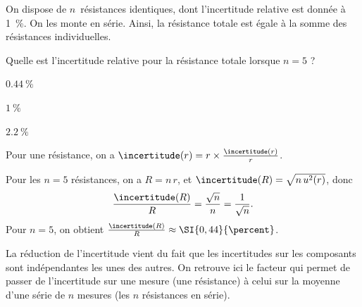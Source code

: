 \hauteurLargeurCadreReponse		{6mm}{1.5cm}
\initialisationEntrainement

On dispose de $n$~résistances identiques, dont l'incertitude relative est donnée à \SI{1}{\percent}. On les monte en série. Ainsi, la résistance totale est égale à la somme des résistances individuelles.

\debutEntrainement


\begin{enonce}
  Quelle est  l'incertitude relative pour la résistance totale lorsque $n=5$ ?
	
	\begin{listeQCM3Colonnes}
    \item $\SI{0,44}{\percent}$
	\item $\SI{1}{\percent}$
	\item $\SI{2,2}{\percent}$
	\end{listeQCM3Colonnes}

\end{enonce}

\reponse{\reponseA{}}

\begin{corrige}
 Pour une résistance, on a \( \incertitude(r) = r \times \frac{\incertitude(r)}{r} \). 
 
 Pour les $n=5$ résistances, on a \(R=n\, r\), et \(\incertitude(R)=\sqrt{ n \, u^2(r) }\), donc 
 \[
  \frac{\incertitude(R)}{R}=\frac{\sqrt{n}}{n} = \frac{1}{\sqrt{n}}.
  \]
  Pour $n=5$, on obtient \( \frac{\incertitude(R)}{R}  \approx \SI{0,44}{\percent} \).
  
  La réduction de l'incertitude vient du fait que les incertitudes sur les composants sont indépendantes les unes des autres. On retrouve ici le facteur  qui permet de passer de l'incertitude sur une mesure (une résistance) à celui sur la moyenne d'une série de $n$ mesures (les $n$ résistances en série).  
\end{corrige}

